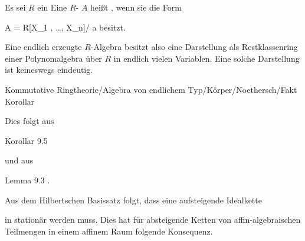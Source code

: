 {}
{




Es sei $R$ ein
 Eine
$R$-
$A$ heißt 
 {} {,}
wenn sie die Form

\mavergleichskettedisp
{\vergleichskette
{A
}
{ =} { R[X_1 , \ldots , X_n]/ {\mathfrak a}
}
{ } {
}
{ } {
}
{ } {
}
}
{}{}{}
besitzt.




}


Eine endlich erzeugte $R$-Algebra besitzt also eine Darstellung als Restklassenring einer Polynomalgebra über $R$ in endlich vielen Variablen. Eine solche Darstellung ist keineswegs eindeutig.






{Kommutative Ringtheorie/Algebra von endlichem Typ/Körper/Noethersch/Fakt}
{Korollar}
{}
{



\faktsituation {}
\faktzusatz {}
\faktzusatz {}




}
{




Dies folgt aus

Korollar 9.5

und aus

Lemma 9.3
.




}












Aus dem Hilbertschen Basissatz folgt, dass eine aufsteigende Idealkette

 {  }

in
 stationär werden muss. Dies hat für absteigende Ketten von affin-algebraischen Teilmengen in einem affinem Raum folgende Konsequenz.




